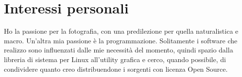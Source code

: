 \section{Interessi personali}
Ho la passione per la fotografia, con una predilezione per quella naturalistica e
macro.\newline
Un'altra mia passione \`e la programmazione. Solitamente i software che realizzo sono
influenzati dalle mie necessit\`a del momento, quindi spazio dalla libreria di sistema
per Linux all'utility grafica e cerco, quando possibile, di condividere quanto creo
distribuendone i sorgenti con licenza Open Source.
